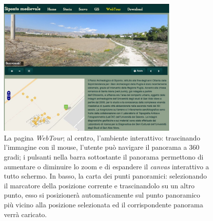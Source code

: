 \documentclass{paper}
\begin{document}
\begin{figure}
    \centering
    \includegraphics[width=0.8\textwidth]{img/webtour}
    \caption[Il webtour]{La pagina \emph{WebTour}; al centro, l'ambiente interattivo: trascinando l'immagine con il mouse, l'utente può navigare il panorama a 360 gradi; i pulsanti nella barra sottostante il panorama permettono di aumentare o diminuire lo zoom e di espandere il \textit{canvas} interattivo a tutto schermo. In basso, la carta dei punti panoramici: selezionando il marcatore della posizione corrente e trascinandolo su un altro punto, esso si posizionerà automaticamente sul punto panoramico più vicino alla posizione selezionata ed il corrispondente panorama verrà caricato.}
    \label{fig:webtour}
\end{figure}
\end{document}
